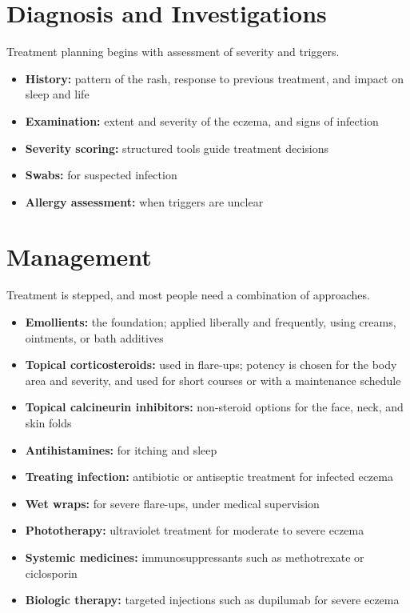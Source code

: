 \section*{Diagnosis and Investigations}
Treatment planning begins with assessment of severity and triggers.
\begin{itemize}
    \item \textbf{History:} pattern of the rash, response to previous treatment, and impact on sleep and life
    \item \textbf{Examination:} extent and severity of the eczema, and signs of infection
    \item \textbf{Severity scoring:} structured tools guide treatment decisions
    \item \textbf{Swabs:} for suspected infection
    \item \textbf{Allergy assessment:} when triggers are unclear
\end{itemize}

\section*{Management}
Treatment is stepped, and most people need a combination of approaches.
\begin{itemize}
    \item \textbf{Emollients:} the foundation; applied liberally and frequently, using creams, ointments, or bath additives
    \item \textbf{Topical corticosteroids:} used in flare-ups; potency is chosen for the body area and severity, and used for short courses or with a maintenance schedule
    \item \textbf{Topical calcineurin inhibitors:} non-steroid options for the face, neck, and skin folds
    \item \textbf{Antihistamines:} for itching and sleep
    \item \textbf{Treating infection:} antibiotic or antiseptic treatment for infected eczema
    \item \textbf{Wet wraps:} for severe flare-ups, under medical supervision
    \item \textbf{Phototherapy:} ultraviolet treatment for moderate to severe eczema
    \item \textbf{Systemic medicines:} immunosuppressants such as methotrexate or ciclosporin
    \item \textbf{Biologic therapy:} targeted injections such as dupilumab for severe eczema
\end{itemize}

